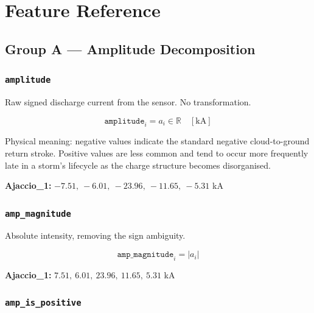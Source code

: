 \documentclass[12pt,a4paper]{article}
\newcommand{\feat}[1]{\texttt{\textbf{#1}}}
\begin{document}
\newpage

\section{Feature Reference}

\subsection{Group A --- Amplitude Decomposition}

\subsubsection*{\feat{amplitude}}

Raw signed discharge current from the sensor. No transformation.

\begin{formulabox}
\[
  \texttt{amplitude}_i = a_i \in \mathbb{R} \quad [\text{kA}]
\]
\end{formulabox}

Physical meaning: negative values indicate the standard negative cloud-to-ground return stroke. Positive values are less common and tend to occur more frequently late in a storm's lifecycle as the charge structure becomes disorganised.

\textbf{Ajaccio\_1:} $-7.51,\ -6.01,\ -23.96,\ -11.65,\ -5.31$ kA

\subsubsection*{\feat{amp\_magnitude}}

Absolute intensity, removing the sign ambiguity.

\begin{formulabox}
\[
  \texttt{amp\_magnitude}_i = |a_i|
\]
\end{formulabox}

\textbf{Ajaccio\_1:} $7.51,\ 6.01,\ 23.96,\ 11.65,\ 5.31$ kA

\subsubsection*{\feat{amp\_is\_positive}}
\end{document}
